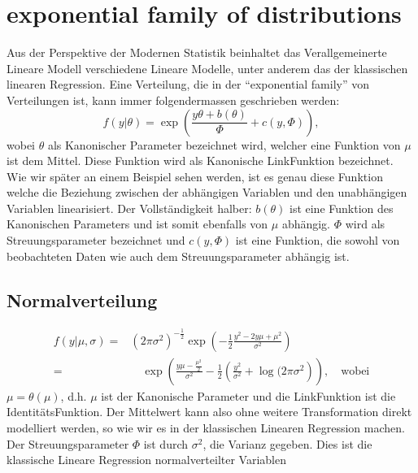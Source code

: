 \documentclass[letterpaper,10pt,english]{jupyterBook}
\begin{document}
\section{exponential family of distributions}
\label{\detokenize{Regression_Techniques:exponential-family-of-distributions}}
\sphinxAtStartPar
Aus der Perspektive der Modernen Statistik beinhaltet das Verallgemeinerte Lineare Modell verschiedene Lineare Modelle, unter anderem das der klassischen linearen Regression. Eine Verteilung, die in der “exponential family” von Verteilungen ist, kann immer folgendermassen geschrieben werden:
\label{equation:Regression_Techniques:bda7f799-b700-4a32-803f-0cab5b7efd6d}\begin{equation}
f(y| \theta) = \exp\left(\frac{y \theta + b(\theta)}{\Phi} + c(y, \Phi)\right),
\end{equation}
\sphinxAtStartPar
wobei \(\theta\) als Kanonischer Parameter bezeichnet wird, welcher eine Funktion von \(\mu\) ist dem Mittel. Diese Funktion wird als Kanonische Link\sphinxhyphen{}Funktion bezeichnet. Wie wir später an einem Beispiel sehen werden, ist es genau diese Funktion welche die Beziehung zwischen der abhängigen Variablen und den unabhängigen Variablen linearisiert.
Der Vollständigkeit halber: \(b(\theta)\) ist eine Funktion des Kanonischen Parameters und ist somit ebenfalls von \(\mu\) abhängig. \(\Phi\) wird als Streuungsparameter bezeichnet und \(c(y, \Phi)\) ist eine Funktion, die sowohl von beobachteten Daten wie auch dem Streuungsparameter abhängig ist.


\subsection{Normalverteilung}
\label{\detokenize{Regression_Techniques:normalverteilung}}\begin{eqnarray*}
f(y| \mu, \sigma) =& (2\pi \sigma^2)^{-\frac{1}{2}} \exp\left(-\frac{1}{2}\frac{y^2 -2y\mu + \mu^2}{\sigma^2}\right) \\
 =&\quad \exp \left(\frac{y\mu -\frac{\mu^2}{2}}{\sigma^2} - \frac{1}{2}\left(\frac{y^2}{\sigma^2} + \log(2\pi\sigma^2\right)\right),\quad \text{wobei}
\end{eqnarray*}
\sphinxAtStartPar
\(\mu = \theta(\mu)\), d.h. \(\mu\) ist der Kanonische Parameter und die Link\sphinxhyphen{}Funktion ist die Identitäts\sphinxhyphen{}Funktion. Der Mittelwert kann also ohne weitere Transformation direkt modelliert werden, so wie wir es in der klassischen Linearen Regression machen.
Der Streuungsparameter \(\Phi\) ist durch \(\sigma^2\), die Varianz gegeben. Dies ist die klassische Lineare Regression normalverteilter Variablen
\end{document}
